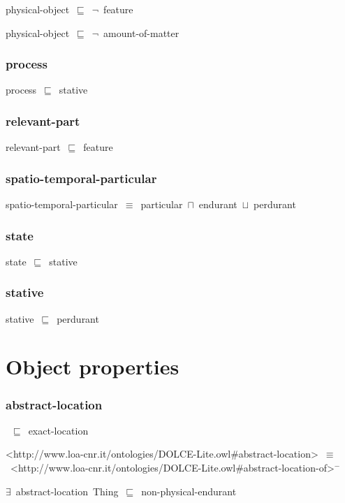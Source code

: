\documentclass{article}
\begin{document}
physical-object~\ensuremath{\sqsubseteq}~\ensuremath{\lnot}~feature

physical-object~\ensuremath{\sqsubseteq}~\ensuremath{\lnot}~amount-of-matter

\subsubsection*{process}

process~\ensuremath{\sqsubseteq}~stative~

\subsubsection*{relevant-part}

relevant-part~\ensuremath{\sqsubseteq}~feature~

\subsubsection*{spatio-temporal-particular}

spatio-temporal-particular~\ensuremath{\equiv}~particular~\ensuremath{\sqcap}~endurant~\ensuremath{\sqcup}~perdurant

\subsubsection*{state}

state~\ensuremath{\sqsubseteq}~stative~

\subsubsection*{stative}

stative~\ensuremath{\sqsubseteq}~perdurant~

\section*{Object properties}\subsubsection*{abstract-location}

~\ensuremath{\sqsubseteq}~exact-location

<http://www.loa-cnr.it/ontologies/DOLCE-Lite.owl#abstract-location>~\ensuremath{\equiv}~<http://www.loa-cnr.it/ontologies/DOLCE-Lite.owl#abstract-location-of>\ensuremath{^-}

\ensuremath{\exists}~abstract-location~Thing~\ensuremath{\sqsubseteq}~non-physical-endurant
\end{document}
